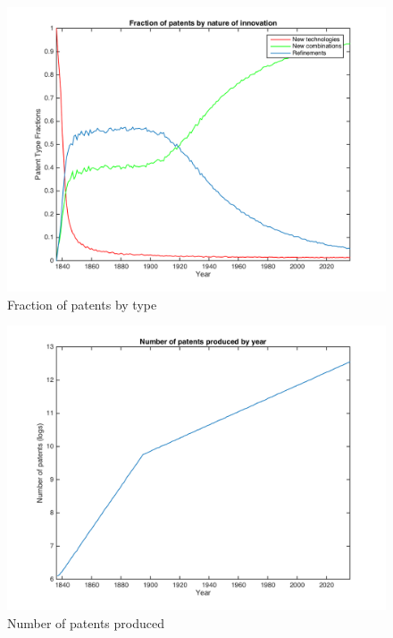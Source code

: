 \documentclass[a4paper,11pt]{article}
\begin{document}
\begin{figure}[h!]
\begin{center}
\includegraphics[scale=.8]{figures/patents.png}
\caption{Fraction of patents by type}
\end{center}
\end{figure}

\begin{figure}[h!]
\begin{center}
\includegraphics[scale=.8]{figures/num_pats.png}
\caption{Number of patents produced}
\end{center}
\end{figure}
\end{document}
